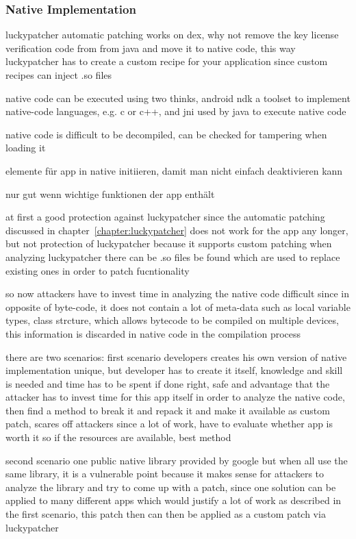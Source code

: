 \subsubsection{Native Implementation} \label{subsection:counter-modifications-dynamic}
luckypatcher automatic patching works on dex, why not remove the key license verification code from from java and move it to native code, this way luckypatcher has to create a custom recipe for your application since custom recipes can inject .so files

native code can be executed using two thinks, android ndk a toolset to implement native-code languages, e.g. c or c++, and  \gls{jni} used by java to execute native code

native code is difficult to be decompiled, can be checked for tampering when loading it

elemente für app in native initiieren, damit man nicht einfach deaktivieren kann

nur gut wenn wichtige funktionen der app enthält



at first a good protection against luckypatcher since the automatic patching discussed in chapter~\ref{chapter:luckypatcher} does not work for the app any longer, but not protection of luckypatcher because it supports custom patching
when analyzing luckypatcher there can be .so files be found which are used to replace existing ones in order to patch fucntionality

so now attackers have to invest time in analyzing the native code
difficult since in opposite of byte-code, it does not contain a lot of meta-data such as local variable types, class strcture, which allows bytecode to be compiled on multiple devices, this information is discarded in native code in the compilation process

there are two scenarios:
first scenario
developers creates his own version of native implementation
unique, but developer has to create it itself, knowledge and skill is needed and time has to be spent
if done right, safe and advantage that the attacker has to invest time for this app itself in order to analyze the native code, then find a method to break it and repack it and make it available as custom patch, scares off attackers since a lot of work, have to evaluate whether app is worth it
so if the resources are available, best method

second scenario
one public native library provided by google
but when all use the same library, it is a vulnerable point because it makes sense for attackers to analyze the library and try to come up with a patch, since one solution can be applied to many different apps which would justify a lot of work as described in the first scenario, this patch then can then be applied as a custom patch via luckypatcher

